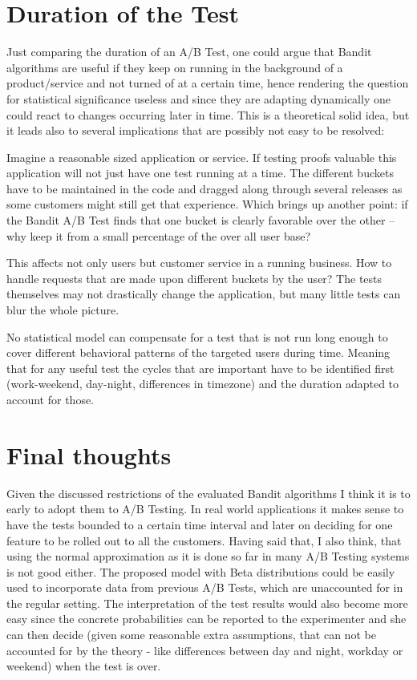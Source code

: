 \documentclass[main.tex]{subfiles}
\begin{document}
\section{Duration of the Test}
Just comparing the duration of an A/B Test, one could argue that Bandit algorithms are useful if they keep on running in the background of a product/service and not turned of at a certain time, hence rendering the question for statistical significance useless and since they are adapting dynamically one could react to changes occurring later in time. This is a theoretical solid idea, but it leads also to several implications that are possibly not easy to be resolved: 

Imagine a reasonable sized application or service. If testing proofs valuable this application will not just have one test running at a time. The different buckets have to be maintained in the code and dragged along through several releases as some customers might still get that experience. Which brings up another point: if the Bandit A/B Test finds that one bucket is clearly favorable over the other -- why keep it from a small percentage of the over all user base?

This affects not only users but customer service in a running business. How to handle requests that are made upon different buckets by the user? The tests themselves may not drastically change the application, but many little tests can blur the whole picture.

No statistical model can compensate for a test that is not run long enough to cover different behavioral patterns of the targeted users during time. Meaning that for any useful test the cycles that are important have to be identified first (work-weekend, day-night, differences in timezone) and the duration adapted to account for those.

\section{Final thoughts}
Given the discussed restrictions of the evaluated Bandit algorithms I think it is to early to adopt them to A/B Testing. In real world applications it makes sense to have the tests bounded to a certain time interval and later on deciding for one feature to be rolled out to all the customers. Having said that, I also think, that using the normal approximation as it is done so far in many A/B Testing systems is not good either. The proposed model with Beta distributions could be easily used to incorporate data from previous A/B Tests, which are unaccounted for in the regular setting. The interpretation of the test results would also become more easy since the concrete probabilities can be reported to the experimenter and she can then decide (given some reasonable extra assumptions, that can not be accounted for by the theory - like differences between day and night, workday or weekend) when the test is over.

\end{document}
